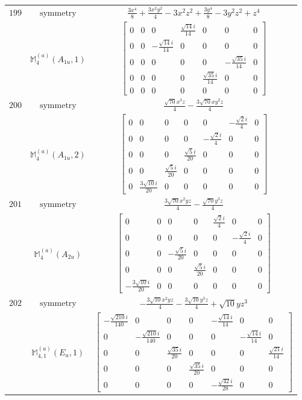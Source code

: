 \documentclass[fleqn,8pt,landscape]{jsarticle}
\begin{document}
\begin{longtable}{ccc}
$ 199 $ & $ \text{symmetry} $ & $ \frac{3 x^{4}}{8} + \frac{3 x^{2} y^{2}}{4} - 3 x^{2} z^{2} + \frac{3 y^{4}}{8} - 3 y^{2} z^{2} + z^{4} $ \\
$  $ & $ \mathbb{M}_{4}^{(a)}(A_{1u},1) $ & $ \begin{bmatrix} 0 & 0 & 0 & \frac{\sqrt{14} i}{14} & 0 & 0 & 0 \\ 0 & 0 & - \frac{\sqrt{14} i}{14} & 0 & 0 & 0 & 0 \\ 0 & 0 & 0 & 0 & 0 & - \frac{\sqrt{35} i}{14} & 0 \\ 0 & 0 & 0 & 0 & \frac{\sqrt{35} i}{14} & 0 & 0 \\ 0 & 0 & 0 & 0 & 0 & 0 & 0 \end{bmatrix} $ \\ \hline
$ 200 $ & $ \text{symmetry} $ & $ \frac{\sqrt{70} x^{3} z}{4} - \frac{3 \sqrt{70} x y^{2} z}{4} $ \\
$  $ & $ \mathbb{M}_{4}^{(a)}(A_{1u},2) $ & $ \begin{bmatrix} 0 & 0 & 0 & 0 & 0 & - \frac{\sqrt{2} i}{4} & 0 \\ 0 & 0 & 0 & 0 & - \frac{\sqrt{2} i}{4} & 0 & 0 \\ 0 & 0 & 0 & \frac{\sqrt{5} i}{20} & 0 & 0 & 0 \\ 0 & 0 & \frac{\sqrt{5} i}{20} & 0 & 0 & 0 & 0 \\ 0 & \frac{3 \sqrt{10} i}{20} & 0 & 0 & 0 & 0 & 0 \end{bmatrix} $ \\ \hline
$ 201 $ & $ \text{symmetry} $ & $ \frac{3 \sqrt{70} x^{2} y z}{4} - \frac{\sqrt{70} y^{3} z}{4} $ \\
$  $ & $ \mathbb{M}_{4}^{(a)}(A_{2u}) $ & $ \begin{bmatrix} 0 & 0 & 0 & 0 & \frac{\sqrt{2} i}{4} & 0 & 0 \\ 0 & 0 & 0 & 0 & 0 & - \frac{\sqrt{2} i}{4} & 0 \\ 0 & 0 & - \frac{\sqrt{5} i}{20} & 0 & 0 & 0 & 0 \\ 0 & 0 & 0 & \frac{\sqrt{5} i}{20} & 0 & 0 & 0 \\ - \frac{3 \sqrt{10} i}{20} & 0 & 0 & 0 & 0 & 0 & 0 \end{bmatrix} $ \\ \hline
$ 202 $ & $ \text{symmetry} $ & $ - \frac{3 \sqrt{10} x^{2} y z}{4} - \frac{3 \sqrt{10} y^{3} z}{4} + \sqrt{10} y z^{3} $ \\
$  $ & $ \mathbb{M}_{4,1}^{(a)}(E_{u},1) $ & $ \begin{bmatrix} - \frac{\sqrt{210} i}{140} & 0 & 0 & 0 & - \frac{\sqrt{14} i}{14} & 0 & 0 \\ 0 & - \frac{\sqrt{210} i}{140} & 0 & 0 & 0 & - \frac{\sqrt{14} i}{14} & 0 \\ 0 & 0 & \frac{\sqrt{35} i}{20} & 0 & 0 & 0 & \frac{\sqrt{21} i}{14} \\ 0 & 0 & 0 & \frac{\sqrt{35} i}{20} & 0 & 0 & 0 \\ 0 & 0 & 0 & 0 & - \frac{\sqrt{42} i}{28} & 0 & 0 \end{bmatrix} $ \\ \hline

\end{longtable}
\end{document}
